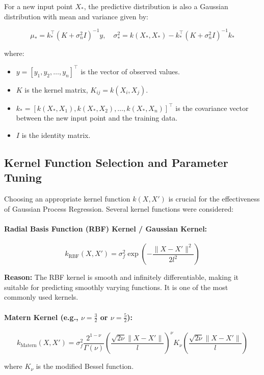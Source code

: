 \documentclass[11pt]{article}
\begin{document}
For a new input point $X_*$, the predictive distribution is also a Gaussian distribution with mean and variance given by:

\[
\mu_* = k_*^\top (K + \sigma_n^2 I)^{-1} y, \quad \sigma_*^2 = k(X_*, X_*) - k_*^\top (K + \sigma_n^2 I)^{-1} k_*
\]

where:

\begin{itemize}
    \item $y = [y_1, y_2, \dots, y_n]^\top$ is the vector of observed values.
    \item $K$ is the kernel matrix, $K_{ij} = k(X_i, X_j)$.
    \item $k_* = [k(X_*, X_1), k(X_*, X_2), \dots, k(X_*, X_n)]^\top$ is the covariance vector between the new input point and the training data.
    \item $I$ is the identity matrix.
\end{itemize}

\subsection{Kernel Function Selection and Parameter Tuning}

Choosing an appropriate kernel function $k(X, X')$ is crucial for the effectiveness of Gaussian Process Regression. Several kernel functions were considered:

\paragraph{Radial Basis Function (RBF) Kernel / Gaussian Kernel:}

\[
k_{\text{RBF}}(X, X') = \sigma_f^2 \exp\left( -\frac{\| X - X' \|^2}{2 l^2} \right)
\]

\textbf{Reason:} The RBF kernel is smooth and infinitely differentiable, making it suitable for predicting smoothly varying functions. It is one of the most commonly used kernels.

\paragraph{Matern Kernel (e.g., $\nu = \frac{3}{2}$ or $\nu = \frac{5}{2}$):}

\[
k_{\text{Matern}}(X, X') = \sigma_f^2 \frac{2^{1 - \nu}}{\Gamma(\nu)} \left( \frac{\sqrt{2\nu} \| X - X' \|}{l} \right)^\nu K_\nu \left( \frac{\sqrt{2\nu} \| X - X' \|}{l} \right)
\]

where $K_\nu$ is the modified Bessel function.
\end{document}
